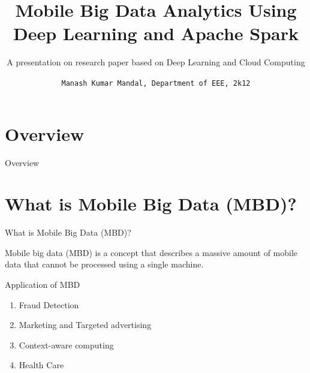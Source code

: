 \documentclass[newPxFont]{beamer}
\title{Mobile Big Data Analytics
Using Deep Learning and Apache Spark}
\subtitle{A presentation on research paper based on Deep Learning and Cloud Computing}
\date{}
\author{\texttt{Manash Kumar Mandal, Department of EEE, 2k12}}
\institute{\textit{Khulna University of Engineering \& Technology}}
\begin{document}
%
%

\maketitle


%
%


\section*{Overview}
\begin{frame}[allowframebreaks]{Overview}
\tableofcontents[hideallsubsections]
\end{frame}


\section{What is Mobile Big Data (MBD)?}

\begin{frame}[c]{What is Mobile Big Data (MBD)?}

\alert{Mobile big data (MBD)} is a concept that describes
a massive amount of mobile data that cannot be processed
using a single machine.

\vspace{1em}

\begin{exampleblock}{Application of MBD}
\begin{enumerate}
	\item{Fraud Detection}
    \item{Marketing and Targeted advertising}
    \item{Context-aware computing}
    \item{Health Care}
\end{enumerate}

\end{exampleblock}
\end{frame}

\end{document}
